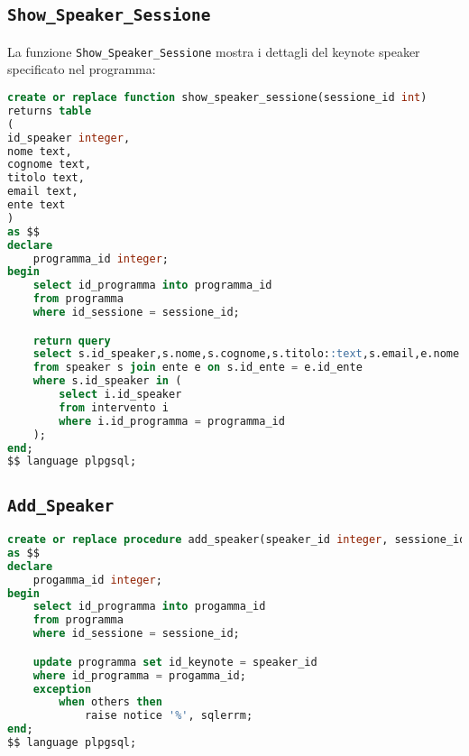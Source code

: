 \subsection{\texttt{Show\_Speaker\_Sessione}}
La funzione \texttt{Show\_Speaker\_Sessione} mostra i dettagli del keynote speaker specificato nel programma:
\begin{lstlisting}[language=SQL,style=mystyle]
create or replace function show_speaker_sessione(sessione_id int)
returns table
(
id_speaker integer,
nome text,
cognome text,
titolo text,
email text,
ente text
)
as $$
declare
    programma_id integer;
begin
    select id_programma into programma_id
    from programma
    where id_sessione = sessione_id;

    return query
    select s.id_speaker,s.nome,s.cognome,s.titolo::text,s.email,e.nome
    from speaker s join ente e on s.id_ente = e.id_ente
    where s.id_speaker in (
        select i.id_speaker
        from intervento i
        where i.id_programma = programma_id
    );
end;
$$ language plpgsql;
\end{lstlisting}
\subsection{\texttt{Add\_Speaker}}
\begin{lstlisting}[language=SQL, style=mystyle]
create or replace procedure add_speaker(speaker_id integer, sessione_id integer)
as $$
declare
    progamma_id integer;
begin
    select id_programma into progamma_id
    from programma
    where id_sessione = sessione_id;

    update programma set id_keynote = speaker_id
    where id_programma = progamma_id;
    exception
        when others then
            raise notice '%', sqlerrm;
end;
$$ language plpgsql;
\end{lstlisting}